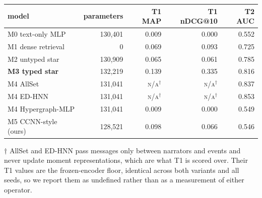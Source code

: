 \setlength{\tabcolsep}{3pt}
\begin{tabular}{lrrrr}
\toprule
model & parameters & T1 MAP & T1 nDCG@10 & T2 AUC \\
\midrule
M0 text-only MLP & 130,401 & 0.009 & 0.000 & 0.552 \\
M1 dense retrieval & 0 & 0.069 & 0.093 & 0.725 \\
M2 untyped star & 130,909 & 0.065 & 0.061 & 0.785 \\
\bf M3 typed star & 132,219 & 0.139 & 0.335 & 0.816 \\
M4 AllSet & 131,041 & \textsc{n/a}$^{\dagger}$ & \textsc{n/a}$^{\dagger}$ & 0.837 \\
M4 ED-HNN & 131,041 & \textsc{n/a}$^{\dagger}$ & \textsc{n/a}$^{\dagger}$ & 0.853 \\
M4 Hypergraph-MLP & 131,041 & 0.009 & 0.000 & 0.549 \\
M5 CCNN-style (ours) & 128,521 & 0.098 & 0.066 & 0.546 \\
\bottomrule
\end{tabular}

\vspace{2pt}
{\footnotesize $\dagger$ AllSet and ED-HNN pass messages only between narrators and events and never update moment representations, which are what T1 is scored over. Their T1 values are the frozen-encoder floor, identical across both variants and all seeds, so we report them as undefined rather than as a measurement of either operator.}